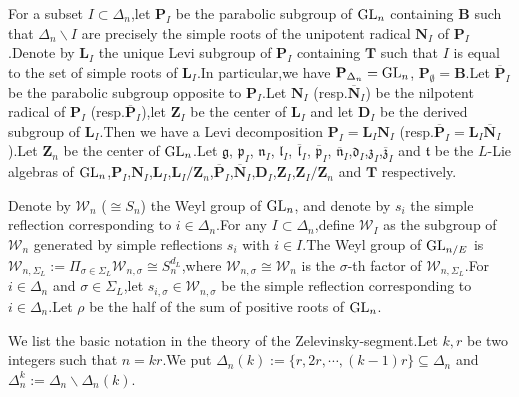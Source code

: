 \documentclass[SecEq,CM,GP]{degruyter-crelle} %
\theoremstyle{plain}
\newcommand{\GLN}{{\rm GL}}
\newcommand{\bB}{{\mathbf{B}}}
\newcommand{\bD}{{\mathbf{D}}}
\newcommand{\bT}{{\mathbf{T}}}
\newcommand{\bZ}{{\mathbf{Z}}}
\newcommand{\fd}{{\mathfrak{d}}}
\newcommand{\fg}{{\mathfrak{g}}}
\newcommand{\fl}{{\mathfrak{l}}}
\newcommand{\fn}{{\mathfrak{n}}}
\newcommand{\fp}{{\mathfrak{p}}}
\newcommand{\ft}{{\mathfrak{t}}}
\newcommand{\fz}{{\mathfrak{z}}}
\newcommand{\sW}{\mathscr W}
\begin{document}
For a subset $I\subset \Delta_n$,\;let $\mathbf{P}_I$ be the parabolic subgroup of
$\GLN_n$ containing $\bB$ such that $\Delta_n \backslash  I$ are precisely the simple roots of the unipotent radical $\mathbf{N}_I$ of $\mathbf{P}_I$.\;Denote by $\mathbf{L}_I$ the unique Levi subgroup of $\mathbf{P}_I$ containing $\bT$ such that $I$ is equal to the set of simple roots of $\mathbf{L}_I$.\;In particular,\;we have $\mathbf{P}_{\Delta_n}=\GLN_n$, $\mathbf{P}_{\emptyset}=\mathbf{B}$.\;Let $\overline{\mathbf{P}}_I$ be the parabolic subgroup opposite to $\mathbf{P}_I$.\;Let $\mathbf{N}_I$ (resp.\;$\overline{\mathbf{N}}_I$) be the nilpotent radical of $\mathbf{P}_I$ (resp.\;$\overline{\mathbf{P}}_I$),\;let $\mathbf{Z}_I$ be the center of $\mathbf{L}_I$ and let $\mathbf{D}_I$ be the derived subgroup of $\mathbf{L}_I$.\;Then we have a Levi decomposition $\mathbf{P}_I=\mathbf{L}_I\mathbf{N}_I$ (resp.\;$\overline{\mathbf{P}}_I=\mathbf{L}_I\overline{\mathbf{N}}_I$).\;Let $\bZ_n$ be the center of $\GLN_n$.\;Let $\fg$, $\fp_I$, $\fn_I$, $\fl_I$, $\overline{\fl}_I$, $\overline{\fp}_I$, $\overline{\fn}_I$,\;$\fd_I$,\;$\fz_I$,\;$\overline{\fz}_I$ and $\ft$ be the $L$-Lie algebras of $\GLN_n$,\;$\mathbf{P}_I$,\;$\mathbf{N}_I$,\;$\mathbf{L}_I$,\;$\mathbf{L}_I/\bZ_n$,\;$\overline{\mathbf{P}}_I$,\;$\overline{\mathbf{N}}_I$,\;$\bD_I$,\;$\bZ_{I}$,\;$\bZ_{I}/\bZ_n$ and $\bT$ respectively.\;



Denote by $\sW_n$ ($\cong S_n$) the Weyl group of $\GLN_n$, and denote by $s_i$ the simple reflection corresponding to $i\in \Delta_n$.\;For any $I\subset \Delta_n$,\;define $\sW_{I}$ as the subgroup of $\sW_{n}$ generated by simple reflections $s_i$ with $i\in I$.\;The Weyl group of $\GLN_{n/E}$ is $\sW_{n,\Sigma_L}:=\Pi_{\sigma\in \Sigma_L}\sW_{n,\sigma}\cong S_n^{d_L}$,\;where $\sW_{n,\sigma}\cong \sW_n$ is the $\sigma$-th factor of $\sW_{n,\Sigma_L}$.\;For $i\in \Delta_n$ and $\sigma\in \Sigma_L$,\;let $s_{i,\sigma}\in \sW_{n,\sigma}$ be the simple reflection corresponding to $i\in \Delta_n$.\;Let $\rho$ be the half of the sum of positive roots of $\GLN_n$.\;

We list the basic notation in the theory of the Zelevinsky-segment.\;Let $k,r$ be two integers such that $n=kr$.\;We put ${\Delta_n(k)}:=\{r,2r,\cdots,(k-1)r\}\subseteq \Delta_{n}$ and  $\Delta_n^k:=\Delta_{n}\backslash{\Delta_n(k)}$.\;
\end{document}
